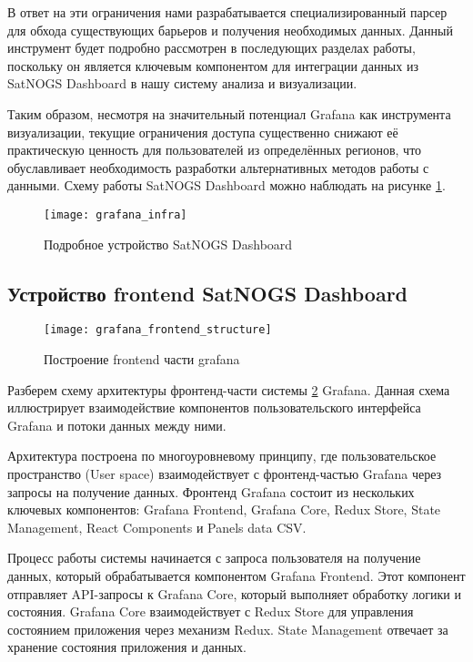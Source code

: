 В ответ на эти ограничения нами разрабатывается специализированный парсер для
обхода существующих барьеров и получения необходимых данных. Данный инструмент
будет подробно рассмотрен в последующих разделах работы, поскольку он является
ключевым компонентом для интеграции данных из SatNOGS Dashboard в нашу систему
анализа и визуализации.

Таким образом, несмотря на значительный потенциал Grafana как инструмента
визуализации, текущие ограничения доступа существенно снижают её практическую
ценность для пользователей из определённых регионов, что обуславливает
необходимость разработки альтернативных методов работы с данными.
Схему работы SatNOGS Dashboard можно наблюдать на рисунке
\ref{fig:grafana_infra}.

\begin{figure}[htbp]
	\centering
	\texttt{[image: grafana\_infra]}
	\caption{Подробное устройство SatNOGS Dashboard}
	\label{fig:grafana_infra}
\end{figure}

\subsection{Устройство frontend SatNOGS Dashboard}
\begin{figure}[htbp]
	\centering
	\texttt{[image: grafana\_frontend\_structure]}
	\caption{Построение frontend части grafana \cite{react_managing_state}}
	\label{fig:grafana_frontend_structure}
\end{figure}

Разберем схему архитектуры фронтенд-части системы
\ref{fig:grafana_frontend_structure}
Grafana.
Данная схема иллюстрирует взаимодействие компонентов пользовательского
интерфейса Grafana и потоки данных между ними.

Архитектура построена по многоуровневому принципу, где пользовательское
пространство (User space) взаимодействует с фронтенд-частью Grafana через
запросы на получение данных. Фронтенд Grafana состоит из нескольких ключевых
компонентов: Grafana Frontend, Grafana Core, Redux Store, State Management,
React Components и Panels data CSV.

Процесс работы системы начинается с запроса пользователя на получение данных,
который обрабатывается компонентом Grafana Frontend. Этот компонент отправляет
API-запросы к Grafana Core, который выполняет обработку логики и состояния.
Grafana Core взаимодействует с Redux Store для управления состоянием приложения
через механизм Redux. State Management отвечает за хранение состояния
приложения и данных.

